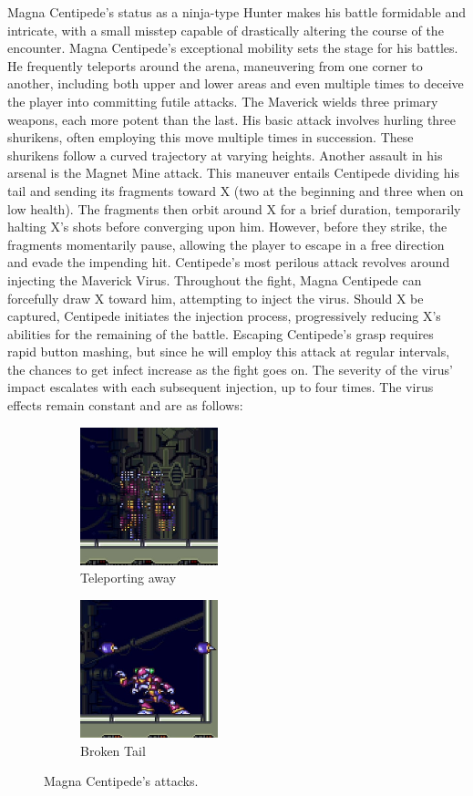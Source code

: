 Magna Centipede's status as a ninja-type Hunter makes his battle formidable and intricate, with a small misstep capable of drastically altering the course of the encounter. Magna Centipede's exceptional mobility sets the stage for his battles. He frequently teleports around the arena, maneuvering from one corner to another, including both upper and lower areas and even multiple times to deceive the player into committing futile attacks. The Maverick wields three primary weapons, each more potent than the last. His basic attack involves hurling three shurikens, often employing this move multiple times in succession. These shurikens follow a curved trajectory at varying heights. Another assault in his arsenal is the Magnet Mine attack. This maneuver entails Centipede dividing his tail and sending its fragments toward X (two at the beginning and three when on low health). The fragments then orbit around X for a brief duration, temporarily halting X's shots before converging upon him. However, before they strike, the fragments momentarily pause, allowing the player to escape in a free direction and evade the impending hit. Centipede's most perilous attack revolves around injecting the Maverick Virus. Throughout the fight, Magna Centipede can forcefully draw X toward him, attempting to inject the virus. Should X be captured, Centipede initiates the injection process, progressively reducing X's abilities for the remaining of the battle. Escaping Centipede's grasp requires rapid button mashing, but since he will employ this attack at regular intervals, the chances to get infect increase as the fight goes on. The severity of the virus' impact escalates with each subsequent injection, up to four times. The virus effects remain constant and are as follows:
\begin{figure}[htp]
	\ContinuedFloat
	\centering
	\begin{subfigure}{0.4\linewidth}
		\centering
		\includegraphics[height=4cm]{figures/X2/Magna_centipede/Centipede_teleport.png}
		\caption{Teleporting away}
	\end{subfigure}
	\begin{subfigure}{0.4\linewidth}
		\centering
		\includegraphics[height=4cm]{figures/X2/Magna_centipede/Centipede_no_tail.png}
		\caption{Broken Tail}
	\end{subfigure}
	\caption{Magna Centipede's attacks.}	
\end{figure}
